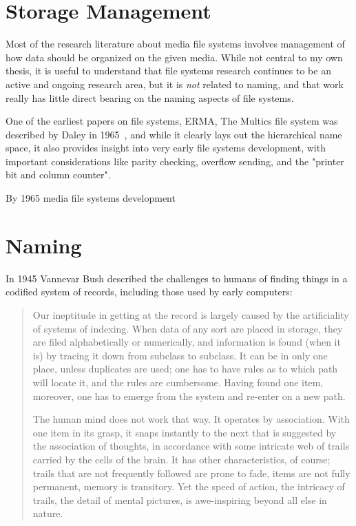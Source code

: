 \section{Storage Management}
\label{ch:background:sec:storage}

Most of the research literature about media file systems involves management of how
data should be organized on the given media. While not central to my own thesis,
it is useful to understand that file systems research continues to be an active
and ongoing research area, but it is \emph{not} related to naming, and that work
really has little direct bearing on the naming aspects of file systems.

\tm{}


One of the earliest papers on file systems, ERMA,
The Multics file system was described by Daley in 1965~\cite{daley1965general},
and while it clearly lays out the hierarchical name space, it also provides
insight into very early file systems development, with important considerations
like parity checking, overflow sending, and the "printer bit and column
counter".

By 1965 media file systems development


\section{Naming}
\label{ch:background:sec:naming}


In 1945 Vannevar Bush described the challenges to humans of finding things in a
codified system of records, including those used by early computers:

\begin{quotation}
    Our ineptitude in getting at the record is largely
    caused by the artificiality of systems of indexing. When data of any
    sort are placed in storage, they are filed alphabetically or numerically, and
    information is found (when it is) by tracing it down from subclass to
    subclass. It can be in only one place, unless duplicates are used; one
    has to have rules as to which path will locate it, and the rules are
    cumbersome. Having found one item, moreover, one has to emerge from the
    system and re-enter on a new path.

    The human mind does not work that way. It operates by association. With one
    item in its grasp, it snaps instantly to the next that is suggested by the
    association of thoughts, in accordance with some intricate web of trails
    carried by the cells of the brain. It has other characteristics, of course;
    trails that are not frequently followed are prone to fade, items are not
    fully permanent, memory is transitory. Yet the speed of action, the
    intricacy of trails, the detail of mental pictures, is awe-inspiring beyond
    all else in nature.
\end{quotation}

